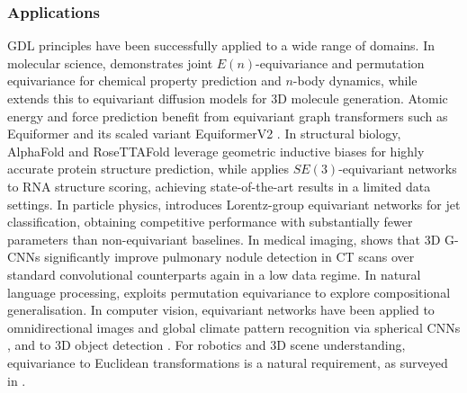 \documentclass[mathematics,review,submit,moreauthors]{Definitions/mdpi}
\begin{document}
\subsubsection{Applications}
GDL principles have been successfully applied to a wide range of domains. In molecular science, \cite{satorras2021p3icml} demonstrates joint $E(n)$-equivariance and permutation equivariance for chemical property prediction and $n$-body dynamics, while \cite{cornet2024} extends this to equivariant diffusion models for 3D molecule generation.
Atomic energy and force prediction benefit from equivariant graph transformers such as Equiformer \cite{liao2022} and its scaled variant EquiformerV2 \cite{liao2023}.
In structural biology, AlphaFold \cite{jumper2021na} and RoseTTAFold \cite{baek2021s} leverage geometric inductive biases for highly accurate protein structure prediction, while \cite{townshend2021s} applies $SE(3)$-equivariant networks to RNA structure scoring, achieving state-of-the-art results in a limited data settings.
In particle physics, \cite{bogatskiy2020p3icml} introduces Lorentz-group equivariant networks for jet classification, obtaining competitive performance with substantially fewer parameters than non-equivariant baselines.
In medical imaging, \cite{winkels2019mia} shows that 3D G-CNNs significantly improve pulmonary nodule detection in CT scans over standard convolutional counterparts again in a low data regime.
In natural language processing, \cite{gordon2020} exploits permutation equivariance to explore compositional generalisation.
In computer vision, equivariant networks have been applied to omnidirectional images and global climate pattern recognition via spherical CNNs \cite{cohen2018,cohen2019p3icml}, and to 3D object detection \cite{yu2022}.
For robotics and 3D scene understanding, equivariance to Euclidean transformations is a natural requirement, as surveyed in \cite{seo2025a,fei2024air}.
\end{document}
